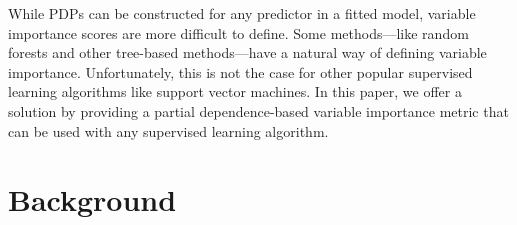 \documentclass{article}
\begin{document}
While PDPs can be constructed for any predictor in a fitted model, variable importance scores are more difficult to define. Some methods---like random forests and other tree-based methods---have a natural way of defining variable importance. Unfortunately, this is not the case for other popular supervised learning algorithms like support vector machines. In this paper, we offer a solution by providing a partial dependence-based variable importance metric that can be used with any supervised learning algorithm.


\section{Background}
\end{document}
